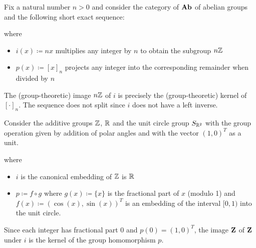 \begin{example}\label{ex:short_exact_sequences}
  \mbox{}
  \begin{defenum}
    \item\label{ex:short_exact_sequences/cyclic_groups} Fix a natural number $n > 0$ and consider the category of $\operatorname{\mathbf{Ab}}$ of abelian groups and the following short exact sequence:
    \begin{center}
    \end{center}
    where
    \begin{itemize}
      \item $i(x) \coloneqq nx$ multiplies any integer by $n$ to obtain the subgroup $n \mathbb Z$
      \item $p(x) \coloneqq [x]_n$ projects any integer into the corresponding remainder when divided by $n$
    \end{itemize}

    The (group-theoretic) image $n \mathbb Z$ of $i$ is precisely the (group-theoretic) kernel of $[\cdot]_n$. The sequence does not split since $i$ does not have a left inverse.

    \item\label{ex:short_exact_sequences/real_number_splitting} Consider the additive groups $\mathbb Z$, $\mathbb R$ and the unit circle group $S_{\mathbb R^2}$ with the group operation given by addition of polar angles and with the vector $(1, 0)^T$ as a unit.
    \begin{center}
    \end{center}
    where
    \begin{itemize}
      \item $i$ is the canonical embedding of $\mathbb Z$ is $\mathbb R$
      \item $p \coloneqq f \circ g$ where $g(x) \coloneqq \{ x \}$ is the fractional part of $x$ (modulo 1) and $f(x) \coloneqq (\cos(x), \sin(x))^T$ is an embedding of the interval $[0, 1)$ into the unit circle.
    \end{itemize}

    Since each integer has fractional part $0$ and $p(0) = (1, 0)^T$, the image $\operatorname{\mathbf{Z}}$ of $\operatorname{\mathbf{Z}}$ under $i$ is the kernel of the group homomorphism $p$.


\end{defenum}
\end{example}

